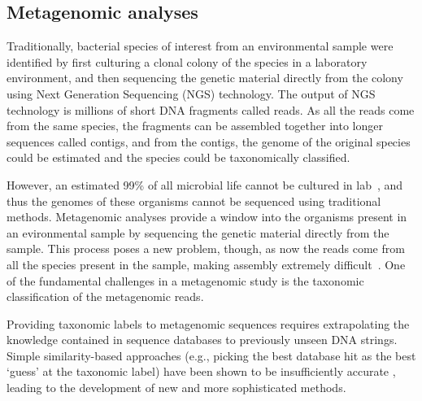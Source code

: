 \subsection{Metagenomic analyses}\label{back:metagenomic}
Traditionally, bacterial species of interest from an environmental sample were identified by first culturing a clonal colony of the species in a laboratory environment, and then sequencing the genetic material directly from the colony using Next Generation Sequencing (NGS) technology.  The output of NGS technology is millions of short DNA fragments called reads.  As all the reads come from the same species, the fragments can be assembled together into longer sequences called contigs, and from the contigs, the genome of the original species could be estimated and the species could be taxonomically classified.

However, an estimated 99\% of all microbial life cannot be cultured in lab~\cite{todo}, and thus the genomes of these organisms cannot be sequenced using traditional methods.  Metagenomic analyses provide a window into the organisms present in an evironmental sample by sequencing the genetic material directly from the sample.  This process poses a new problem, though, as now the reads come from all the species present in the sample, making assembly extremely difficult~\cite{todo}.  One of the fundamental challenges in a metagenomic study is the taxonomic classification of the metagenomic reads.  

Providing taxonomic labels to metagenomic sequences requires
extrapolating the knowledge contained in sequence databases to
previously unseen DNA strings.  Simple similarity-based approaches
(e.g., picking the best database hit as the best `guess' at the
taxonomic label) have been shown to be insufficiently
accurate \cite{closest-blast-hit}, leading to the development of 
new and more sophisticated methods.

